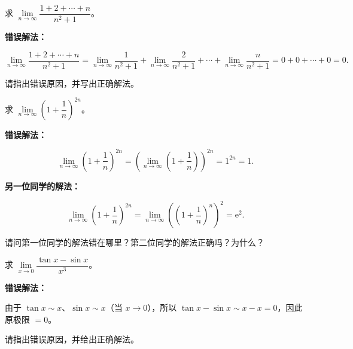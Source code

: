 \documentclass[fontset=fandol]{ctexart}
\newcommand{\ee}{\mathrm{e}}
\begin{document}
\begin{exercise}

求 \(\lim\limits_{n\to\infty} \dfrac{1 + 2 + \cdots + n}{n^2 + 1}\)。



\textbf{错误解法：}

\[

\lim_{n\to\infty} \dfrac{1 + 2 + \cdots + n}{n^2 + 1} = \lim_{n\to\infty} \dfrac{1}{n^2+1} + \lim_{n\to\infty} \dfrac{2}{n^2+1} + \cdots + \lim_{n\to\infty} \dfrac{n}{n^2+1} = 0 + 0 + \cdots + 0 = 0.

\]



请指出错误原因，并写出正确解法。

\end{exercise}



\begin{exercise}

求 \(\lim\limits_{n\to\infty} \left(1 + \dfrac{1}{n}\right)^{2n}\)。



\textbf{错误解法：}

\[

\lim_{n\to\infty} \left(1 + \dfrac{1}{n}\right)^{2n} = \left(\lim_{n\to\infty} \left(1 + \dfrac{1}{n}\right)\right)^{2n} = 1 ^{2n}=1.

\]



\textbf{另一位同学的解法：}

\[

\lim_{n\to\infty} \left(1 + \dfrac{1}{n}\right)^{2n} = \lim_{n\to\infty} \left(\left(1 + \dfrac{1}{n}\right)^n\right)^2 = \ee^2.

\]



请问第一位同学的解法错在哪里？第二位同学的解法正确吗？为什么？

\end{exercise}



\begin{exercise}

求 \(\lim\limits_{x\to 0} \dfrac{\tan x - \sin x}{x^3}\)。



\textbf{错误解法：}

由于 \(\tan x \sim x\)、\(\sin x\sim x\)（当 \(x \to 0\)），所以 \(\tan x-\sin x\sim x-x=0\)，因此原极限 \(=0\)。



请指出错误原因，并给出正确解法。

\end{exercise}
\end{document}
